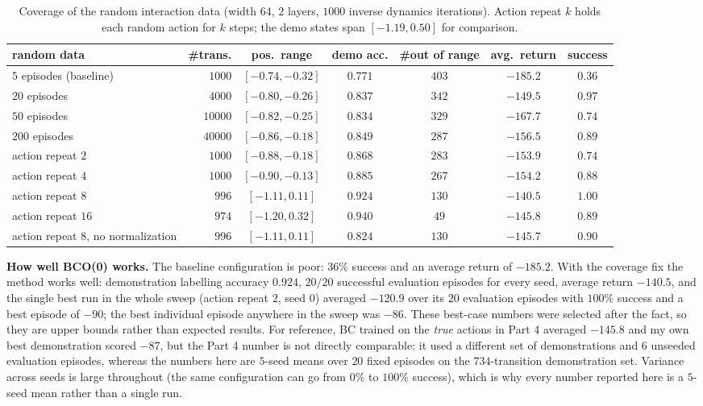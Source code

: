 \documentclass[12pt]{article}%
\begin{document}
\begin{table}[h]
\centering
\footnotesize
\caption{Coverage of the random interaction data (width $64$, $2$ layers, $1000$ inverse
dynamics iterations). Action repeat $k$ holds each random action for $k$ steps; the demo
states span $[-1.19, 0.50]$ for comparison.}
\label{tab:p7cov}
\setlength{\tabcolsep}{3pt}
\begin{tabular}{@{}lrccccc@{}}
\toprule
\textbf{random data} & \textbf{\#trans.} & \textbf{pos.\ range} & \textbf{demo acc.} &
\textbf{\#out of range} & \textbf{avg.\ return} & \textbf{success} \\
\midrule
$5$ episodes (baseline) & $1000$ & $[-0.74, -0.32]$ & $0.771$ & $403$ & $-185.2$ & $0.36$ \\
$20$ episodes & $4000$ & $[-0.80, -0.26]$ & $0.837$ & $342$ & $-149.5$ & $0.97$ \\
$50$ episodes & $10000$ & $[-0.82, -0.25]$ & $0.834$ & $329$ & $-167.7$ & $0.74$ \\
$200$ episodes & $40000$ & $[-0.86, -0.18]$ & $0.849$ & $287$ & $-156.5$ & $0.89$ \\
\midrule
action repeat $2$ & $1000$ & $[-0.88, -0.18]$ & $0.868$ & $283$ & $-153.9$ & $0.74$ \\
action repeat $4$ & $1000$ & $[-0.90, -0.13]$ & $0.885$ & $267$ & $-154.2$ & $0.88$ \\
action repeat $8$ & $996$ & $[-1.11, 0.11]$ & $0.924$ & $130$ & $\mathbf{-140.5}$ & $\mathbf{1.00}$ \\
action repeat $16$ & $974$ & $[-1.20, 0.32]$ & $\mathbf{0.940}$ & $49$ & $-145.8$ & $0.89$ \\
action repeat $8$, no normalization & $996$ & $[-1.11, 0.11]$ & $0.824$ & $130$ & $-145.7$ & $0.90$ \\
\bottomrule
\end{tabular}
\end{table}

\medskip
\noindent\textbf{How well BCO(0) works.} The baseline configuration is poor: $36\%$ success
and an average return of $-185.2$. With the coverage fix the method works well: demonstration
labelling accuracy $0.924$, $20/20$ successful evaluation episodes for every seed, average
return $-140.5$, and the single best run in the whole sweep (action repeat $2$, seed $0$)
averaged $-120.9$ over its $20$ evaluation episodes with $100\%$ success and a best episode
of $-90$; the best individual episode anywhere in the sweep was $-86$. These best-case
numbers were selected after the fact, so they are upper bounds rather than expected results.
For reference, BC trained on the \emph{true} actions in Part 4 averaged $-145.8$ and my own
best demonstration scored $-87$, but the Part 4 number is not directly comparable: it used a
different set of demonstrations and $6$ unseeded evaluation episodes, whereas the numbers
here are $5$-seed means over $20$ fixed episodes on the $734$-transition demonstration set.
Variance across seeds is large throughout
(the same configuration can go from $0\%$ to $100\%$ success), which is why every number
reported here is a $5$-seed mean rather than a single run.
\end{document}
